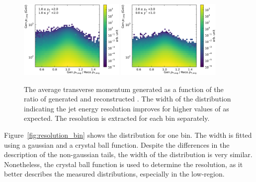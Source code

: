 \begin{figure}[htbp]
    \includegraphics[width=0.45\textwidth]{figures/measurement/gen_vs_reco_vs_gen_ptavg_yb1ys1.pdf}\hfill
    \includegraphics[width=0.45\textwidth]{figures/measurement/gen_vs_reco_vs_gen_ptavg_yb2ys0.pdf}
    \caption[Comparison generated vs. reconstructed transverse energy]{The
    average transverse momentum generated as a function of the ratio of
generated and reconstructed \ptavg. The width of the distribution indicating the
jet energy resolution improves for higher values of \ptavg as expected. The
resolution is extracted for each bin separately.}
    \label{fig:gen_vs_reco_over_gen}
\end{figure}

Figure~\ref{fig:resolution_bin} shows the distribution for one \ptavg bin. The
width is fitted using a gaussian and a crystal ball function. Despite the
differences in the description of the non-gaussian tails, the width of the
distribution is very similar. Nonetheless, the crystal ball function is used to
determine the resolution, as it better describes the measured distributions,
especially in the low-\pt region.

